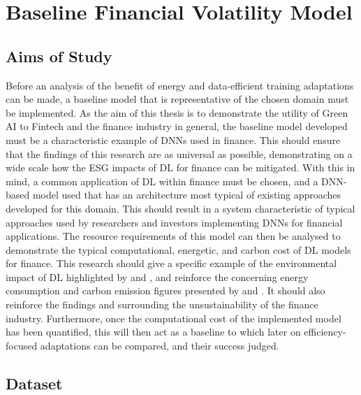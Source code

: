 \documentclass[a4paper, 11pt]{report}
\begin{document}
    \section{Baseline Financial Volatility Model}
    \label{section: baseline}

    \subsection{Aims of Study}

    Before an analysis of the benefit of energy and data-efficient training adaptations can be made, a baseline model that is representative of the chosen domain must be implemented. As the aim of this thesis is to demonstrate the utility of Green AI to Fintech and the finance industry in general, the baseline model developed must be a characteristic example of DNNs used in finance. This should ensure that the findings of this research are as universal as possible, demonstrating on a wide scale how the ESG impacts of DL for finance can be mitigated. With this in mind, a common application of DL within finance must be chosen, and a DNN-based model used that has an architecture most typical of existing approaches developed for this domain. This should result in a system characteristic of typical approaches used by researchers and investors implementing DNNs for financial applications. The resource requirements of this model can then be analysed to demonstrate the typical computational, energetic, and carbon cost of DL models for finance. This research should give a specific example of the environmental impact of DL highlighted by \citet{schwartz-2019} and \citet{strubell-2019}, and reinforce the concerning energy consumption and carbon emission figures presented by \citet{hockstad-2018} and \citet{masanet-2020}. It should also reinforce the findings \citet{greenpeace-2021} and \citet{power-2020} surrounding the unsustainability of the finance industry. Furthermore, once the computational cost of the implemented model has been quantified, this will then act as a baseline to which later on efficiency-focused adaptations can be compared, and their success judged.


    \subsection{Dataset}
    \label{section: dataset}
\end{document}
